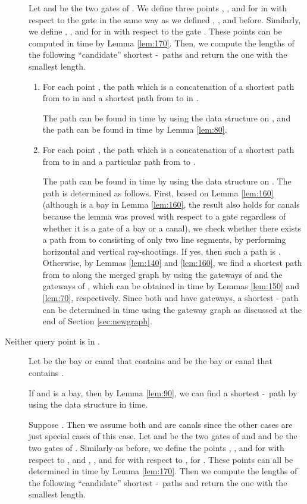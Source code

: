 \documentclass[english,runningheads,11pt]{llncs}
\def\st{-}
\newenvironment{proof}{\noindent {\textbf{Proof:}}\rm}{\hfill \rm}
\begin{document}
\begin{proof}
\begin{description}
Let  and  be the two gates of . We define three points
, ,
and  for  in  with respect to the gate  in the same way as we
defined , , and  before. Similarly, we define , ,
and  for  in  with respect to the gate .  These points
can be computed in  time by Lemma \ref{lem:170}. Then, we
compute the lengths of the following ``candidate'' shortest \st\ paths and
return the one with the smallest length.

\begin{enumerate}
\item
For each point ,
the path which is a concatenation of a shortest path  from  to 
in  and a shortest path  from  to  in .

The path  can be found in  time by using the data structure
 on , and the path  can be found in
 time by Lemma \ref{lem:80}.

\item
For each point , the path which is a
concatenation of a shortest path  from  to 
in  and a particular path  from  to .

The path  can be found in  time by using the data structure
 on . The path  is determined as follows.
First, based on Lemma \ref{lem:160} (although  is a bay in
Lemma \ref{lem:160}, the result also holds for canals because the lemma
was proved with respect to a gate regardless of whether it is a gate of
a bay or a canal), we check whether there exists a
path from  to  consisting of only two line segments, by performing
horizontal and vertical ray-shootings. If yes, then such a path is
. Otherwise, by Lemmas \ref{lem:140} and \ref{lem:160}, we
find a shortest path from  to  along the merged graph 
by using the gateways of  and the gateways of , which can be obtained in 
time by Lemmas \ref{lem:150} and \ref{lem:70}, respectively.
Since both  and  have
 gateways, a shortest - path can be determined
in  time using the gateway graph as discussed at the end of
Section \ref{sec:newgraph}.
\end{enumerate}

\item[Neither query point is in .] Let  be the
bay or canal that contains  and  be the bay or canal that contains .

If  and  is a bay, then by Lemma \ref{lem:90}, we can find a shortest \st\ path
by using the data structure  in  time.

Suppose . Then we assume both  and  are canals since
the other cases are just special cases of this case. Let  and  be
the two gates of  and  and  be
the two gates of . Similarly as before, we define the points ,
, and  for  with respect to ,
and , , and  for  with respect to , for
. These points
can all be determined in  time by Lemma \ref{lem:170}. Then we
compute the lengths of the following ``candidate'' shortest \st\ paths and
return the one with the smallest length.


\end{description}
\end{proof}
\end{document}

